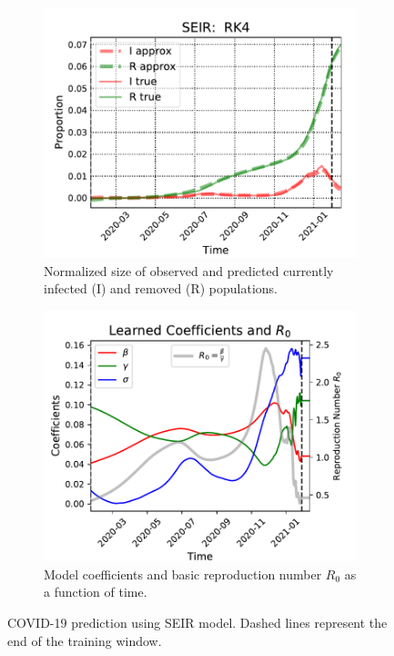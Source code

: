 \documentclass{article}
\begin{document}
 \begin{figure}[hbt!]
     \centering
     \begin{subfigure}[b]{0.48\textwidth}
         \centering
         \includegraphics[width=\textwidth]{images/seir_pde_const_sigma_prop.pdf}
         \caption{Normalized size of observed and predicted currently infected (I) and removed (R) populations.}
         \label{fig:seir1}
     \end{subfigure}
     \hfill
     \begin{subfigure}[b]{0.48\textwidth}
         \centering
         \includegraphics[width=\textwidth]{images/seir_pde_const_sigma_param.pdf}  
         \caption{Model coefficients and basic reproduction number $R_0$ as a function of time. }
         \label{fig:seir2}
     \end{subfigure}
     \caption{COVID-19 prediction using SEIR model.  Dashed lines represent the end of the training window.}
     \label{fig:seir}
 \end{figure}
\end{document}
